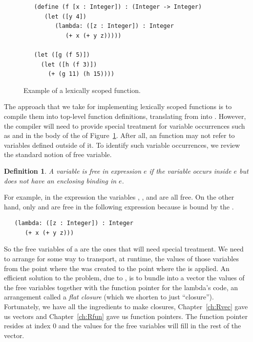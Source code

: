 \documentclass[11pt]{book}
\newtheorem{definition}[theorem]{Definition}
\begin{document}
\begin{figure}[btp]
\begin{lstlisting}
   (define (f [x : Integer]) : (Integer -> Integer)
      (let ([y 4])
         (lambda: ([z : Integer]) : Integer
            (+ x (+ y z)))))

   (let ([g (f 5)])
     (let ([h (f 3)])
       (+ (g 11) (h 15))))
\end{lstlisting}
\caption{Example of a lexically scoped function.}
\label{fig:lexical-scoping}
\end{figure}


The approach that we take for implementing lexically scoped
functions is to compile them into top-level function definitions,
translating from \LangLam{} into \LangFun{}.  However, the compiler will need to
provide special treatment for variable occurrences such as 
and  in the body of the  of
Figure~\ref{fig:lexical-scoping}. After all, an \LangFun{} function may not
refer to variables defined outside of it. To identify such variable
occurrences, we review the standard notion of free variable.

\begin{definition}
A variable is \emph{free in expression} $e$ if the variable occurs
inside $e$ but does not have an enclosing binding in $e$.
\end{definition}

For example, in the expression  the variables
, , and  are all free.  On the other hand,
only  and  are free in the following expression
because  is bound by the .
\begin{lstlisting}
   (lambda: ([z : Integer]) : Integer
      (+ x (+ y z)))
\end{lstlisting}

So the free variables of a  are the ones that will need
special treatment. We need to arrange for some way to transport, at
runtime, the values of those variables from the point where the
 was created to the point where the  is
applied. An efficient solution to the problem, due to
\citet{Cardelli:1983aa}, is to bundle into a vector the values of the
free variables together with the function pointer for the lambda's
code, an arrangement called a \emph{flat closure} (which we shorten to
just ``closure'').   Fortunately,
we have all the ingredients to make closures, Chapter~\ref{ch:Rvec}
gave us vectors and Chapter~\ref{ch:Rfun} gave us function
pointers. The function pointer resides at index $0$ and the
values for the free variables will fill in the rest of the vector.
\end{document}

